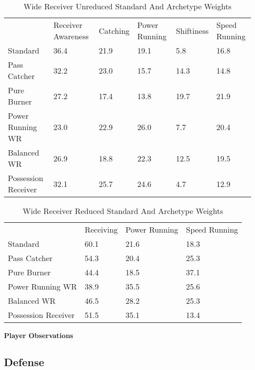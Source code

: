 \documentclass[11pt]{article}
\begin{document}
\begin{table}[]
\centering
\caption{Wide Receiver Unreduced Standard And Archetype Weights}
\label{WideReceiverUnreducedWeights}
\begin{tabular}{llllll}
                    & Receiver Awareness & Catching & Power Running & Shiftiness & Speed Running \\
Standard            & 36.4               & 21.9     & 19.1          & 5.8        & 16.8          \\
Pass Catcher        & 32.2               & 23.0     & 15.7          & 14.3       & 14.8          \\
Pure Burner         & 27.2               & 17.4     & 13.8          & 19.7       & 21.9          \\
Power Running WR    & 23.0               & 22.9     & 26.0          & 7.7        & 20.4          \\
Balanced WR         & 26.9               & 18.8     & 22.3          & 12.5       & 19.5          \\
Possession Receiver & 32.1               & 25.7     & 24.6          & 4.7        & 12.9         
\end{tabular}
\end{table}

\begin{table}[]
\centering
\caption{Wide Receiver Reduced Standard And Archetype Weights}
\label{WideReceiverReducedWeights}
\begin{tabular}{llll}
                    & Receiving & Power Running & Speed Running \\
Standard            & 60.1      & 21.6          & 18.3          \\
Pass Catcher        & 54.3      & 20.4          & 25.3          \\
Pure Burner         & 44.4      & 18.5          & 37.1          \\
Power Running WR    & 38.9      & 35.5          & 25.6          \\
Balanced WR         & 46.5      & 28.2          & 25.3          \\
Possession Receiver & 51.5      & 35.1          & 13.4         
\end{tabular}
\end{table}

\textbf{Player Observations}

\subsection{Defense}
\end{document}
